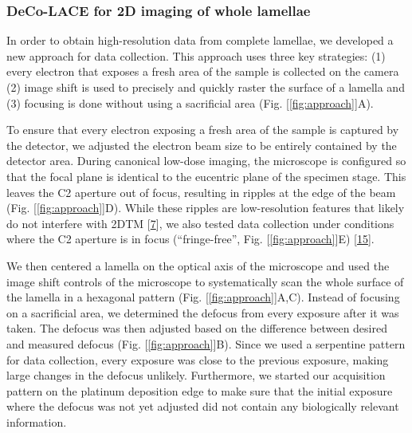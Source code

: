 \documentclass[
]{article}
\begin{document}
\hypertarget{deco-lace-for-2d-imaging-of-whole-lamellae}{%
\subsubsection{DeCo-LACE for 2D imaging of whole lamellae}\label{deco-lace-for-2d-imaging-of-whole-lamellae}}

In order to obtain high-resolution data from complete lamellae, we
developed a new approach for data collection. This approach uses three
key strategies: (1) every electron that exposes a fresh area of the
sample is collected on the camera (2) image shift is used to precisely
and quickly raster the surface of a lamella and (3) focusing is done
without using a sacrificial area (Fig. {[}\ref{fig:approach}{]}A).

To ensure that every electron exposing a fresh area of the sample is
captured by the detector, we adjusted the electron beam size to be
entirely contained by the detector area. During canonical low-dose
imaging, the microscope is configured so that the focal plane is
identical to the eucentric plane of the specimen stage. This leaves the
C2 aperture out of focus, resulting in ripples at the edge of the beam
(Fig. {[}\ref{fig:approach}{]}D). While these ripples are low-resolution features
that likely do not interfere with 2DTM {[}\protect\hyperlink{ref-Ynb3IP6I}{7}{]}, we
also tested data collection under conditions where the C2 aperture is in
focus (``fringe-free'', Fig. {[}\ref{fig:approach}{]}E)
{[}\protect\hyperlink{ref-wsFP5c54}{15}{]}.

We then centered a lamella on the optical axis of the microscope and
used the image shift controls of the microscope to systematically scan
the whole surface of the lamella in a hexagonal pattern (Fig.
{[}\ref{fig:approach}{]}A,C). Instead of focusing on a sacrificial area, we
determined the defocus from every exposure after it was taken. The
defocus was then adjusted based on the difference between desired and
measured defocus (Fig. {[}\ref{fig:approach}{]}B). Since we used a serpentine
pattern for data collection, every exposure was close to the previous
exposure, making large changes in the defocus unlikely. Furthermore, we
started our acquisition pattern on the platinum deposition edge to make
sure that the initial exposure where the defocus was not yet adjusted
did not contain any biologically relevant information.
\end{document}
